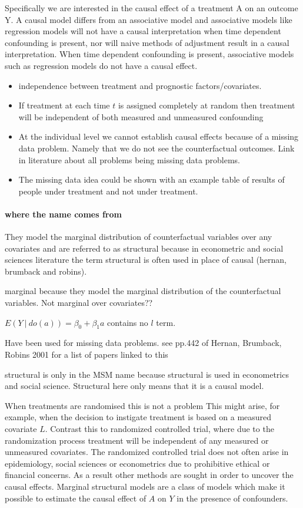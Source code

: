 \documentclass[11pt]{article}
\providecommand{\tightlist}{%
      \setlength{\itemsep}{0pt}\setlength{\parskip}{0pt}}
\begin{document}
Specifically we are interested in the causal effect of a treatment A on
an outcome Y. A causal model differs from an associative model and
associative models like regression models will not have a causal
interpretation when time dependent confounding is present, nor will
naive methods of adjustment result in a causal interpretation. When time
dependent confounding is present, associative models such as regression
models do not have a causal effect.

\begin{itemize}
\tightlist
\item
  independence between treatment and prognostic factors/covariates.
\item
  If treatment at each time \(t\) is assigned completely at random then
  treatment will be independent of both measured and unmeasured
  confounding
\item
  At the individual level we cannot establish causal effects because of
  a missing data problem. Namely that we do not see the counterfactual
  outcomes. Link in literature about all problems being missing data
  problems.
\item
  The missing data idea could be shown with an example table of results
  of people under treatment and not under treatment.
\end{itemize}

\paragraph{where the name comes from}\label{where-the-name-comes-from}

They model the marginal distribution of counterfactual variables over
any covariates and are referred to as structural because in econometric
and social sciences literature the term structural is often used in
place of causal (hernan, brumback and robins).

marginal because they model the marginal distribution of the
counterfactual variables. Not marginal over covariates??

\(E(Y\ |\ do(a)) = \beta_0 + \beta_1a\) contains no \(l\) term.

Have been used for missing data problems. see pp.442 of Hernan,
Brumback, Robins 2001 for a list of papers linked to this

structural is only in the MSM name because structural is used in
econometrics and social science. Structural here only means that it is a
causal model.

When treatments are randomised this is not a problem This might arise,
for example, when the decision to instigate treatment is based on a
measured covariate \(L\). Contrast this to randomized controlled trial,
where due to the randomization process treatment will be independent of
any measured or unmeasured covariates. The randomized controlled trial
does not often arise in epidemiology, social sciences or econometrics
due to prohibitive ethical or financial concerns. As a result other
methods are sought in order to uncover the causal effects. Marginal
structural models are a class of models which make it possible to
estimate the causal effect of \(A\) on \(Y\) in the presence of
confounders.
\end{document}
